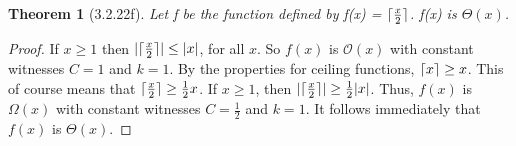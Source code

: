 \documentclass[a4paper, 12pt]{article}
\theoremstyle{plain}
\newtheorem*{theorem*}{Theorem}
\DeclarePairedDelimiter{\ceil}{\lceil}{\rceil}
\begin{document}
	
	\begin{theorem*}[3.2.22f]
		Let f be the function defined by f(x) = $\ceil{\frac{x}{2}}$. \newline f(x) is $\Theta(x)$.
	\end{theorem*}
	
	\begin{proof}
		If $x \ge 1$ then $|\ceil{\frac{x}{2}}| \le |x|$, for all $x$. So $f(x)$ is $\mathcal{O}(x)$ with constant witnesses $C = 1$ and $k = 1$. By the properties for ceiling functions, \newline $\ceil{x} \ge x$. This of course means that $\ceil{\frac{x}{2}} \ge \frac{1}{2}x$. If $x \ge 1$, then $|\ceil{\frac{x}{2}}| \ge \frac{1}{2}|x|$. Thus, $f(x)$ is $\Omega(x)$ with constant witnesses $C = \frac{1}{2}$ and $k = 1$. It follows immediately that $f(x)$ is $\Theta(x)$.
	\end{proof}
\end{document}
